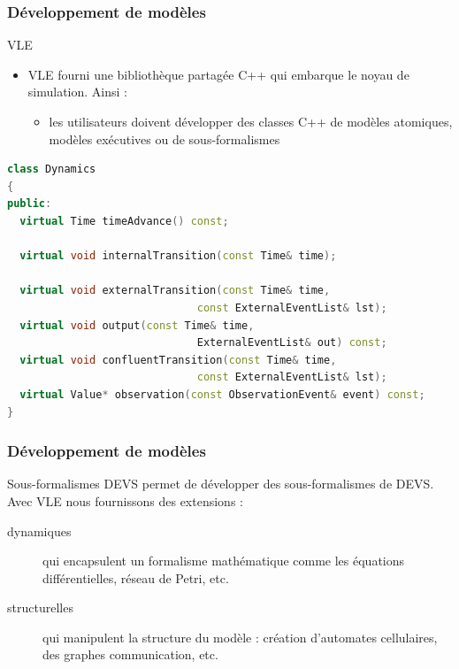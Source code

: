 \documentclass[xetex, compress, table, dvipsnames]{beamer}
\begin{document}
\begin{frame}[fragile]
  \frametitle{Développement de modèles}
  \begin{block}{VLE}
    \begin{itemize}
    \item VLE fourni une bibliothèque partagée C++ qui embarque le
      noyau de simulation. Ainsi :
      \begin{itemize}
      \item les utilisateurs doivent développer des classes C++ de
        modèles atomiques, modèles exécutives ou de sous-formalismes
      \end{itemize}
    \end{itemize}
  \end{block}
  \begin{exampleblock}{}
\begin{lstlisting}[language=c++]
class Dynamics
{
public:
  virtual Time timeAdvance() const;

  virtual void internalTransition(const Time& time);

  virtual void externalTransition(const Time& time,
                              const ExternalEventList& lst);
  virtual void output(const Time& time,
                              ExternalEventList& out) const;
  virtual void confluentTransition(const Time& time,
                              const ExternalEventList& lst);
  virtual Value* observation(const ObservationEvent& event) const;
}
\end{lstlisting}
  \end{exampleblock}
\end{frame}

\begin{frame}
  \frametitle{Développement de modèles}
  \begin{block}{Sous-formalismes}
    DEVS permet de développer des sous-formalismes de DEVS. Avec VLE
    nous fournissons des extensions :
    \begin{description}
    \item[dynamiques] qui encapsulent un formalisme mathématique comme
      les équations différentielles, réseau de Petri, etc.
    \item[structurelles] qui manipulent la structure du modèle :
      création d'automates cellulaires, des graphes communication, etc.
    \end{description}
  \end{block}
\end{frame}
\end{document}
